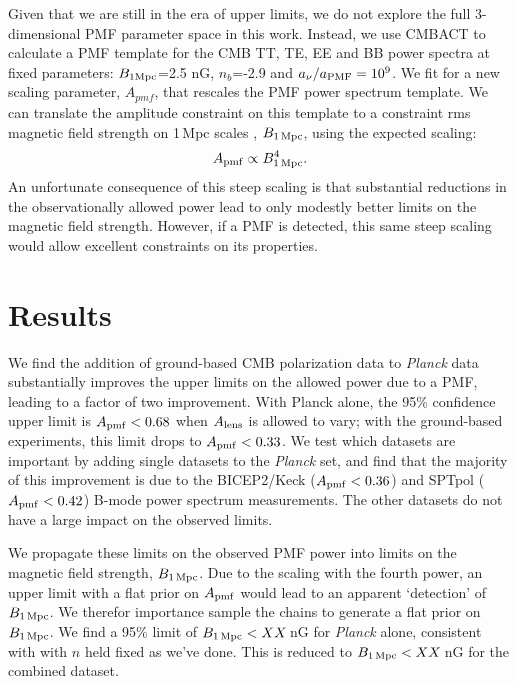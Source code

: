 \documentclass[preprint]{emulateapj}
\newcommand{\apmf}{\ensuremath{A_{\rm pmf}}}
\newcommand{\bpmf}{\ensuremath{B_{\rm 1\,Mpc}}}
\newcommand{\alens}{\ensuremath{A_{\rm lens}}}
\newcommand{\be}{\begin{equation}}
\newcommand{\ee}{\end{equation}}
\newcommand{\planck}{{\sl Planck}}
\newcommand{\bicepkeck}{BICEP2/Keck}
\newcommand{\sptpol}{SPTpol}
\begin{document}
Given that we are still in the era of upper limits,  we do not explore the full 3-dimensional PMF parameter space in this work. 
Instead, we use CMBACT to calculate a PMF template for the CMB TT, TE, EE and BB power spectra at fixed parameters: $B_{\rm{1Mpc}}$=2.5 \rm{nG}, $n_b$=-2.9 and $a_{\nu}/a_{\rm{PMF}}=10^9$. 
We fit for a new scaling parameter, $A_{pmf}$, that rescales the PMF power spectrum template. 
We can translate the amplitude constraint on this template to a constraint rms magnetic field strength on 1\,Mpc scales , \bpmf, using the expected scaling:
\be
\apmf \propto \bpmf^4.
\ee
An unfortunate consequence of this steep scaling is that substantial reductions in the observationally allowed power lead to only modestly better limits on the magnetic field strength. 
However, if a PMF is detected, this same steep scaling would allow excellent constraints on its properties. 


 
\section{Results}
\label{sec:results}

We find the addition of ground-based CMB polarization data to \planck{} data substantially improves the upper limits on the allowed power due to a PMF, leading to a factor of two improvement. 
With Planck alone, the 95\% confidence upper limit is $\apmf <  0.68$ when $\alens$ is allowed to vary; with the ground-based experiments, this limit drops to $\apmf <  0.33$. 
We test which datasets are important by adding single datasets to the \planck{} set, and find that the majority of this improvement is due to the \bicepkeck{} ($\apmf <  0.36$) and \sptpol{} ($\apmf <  0.42$) B-mode power spectrum measurements. 
The other datasets do not have a large impact on the observed limits. 

We propagate these limits on the observed PMF power into limits on the magnetic field strength, \bpmf. 
Due to the scaling with the fourth power, an upper limit with a flat prior on \apmf{} would lead to an apparent `detection' of \bpmf. 
We therefor importance sample the chains to generate a flat prior on \bpmf. 
We find a 95\% limit of $\bpmf < XX$\,nG for \planck{} alone, consistent with \citep{planck15-19} with $n$ held fixed as we've done. 
This is reduced to $\bpmf < XX$\,nG for the combined dataset. 
\end{document}

